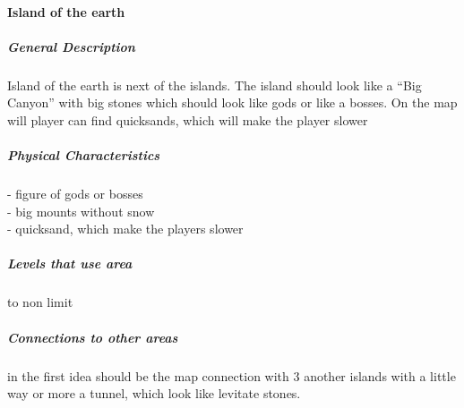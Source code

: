\documentclass[parskip=full]{scrartcl}
\begin{document}
					\paragraph{Island of the earth}\vspace{-0.5cm}
						\subparagraph{General Description} \vspace{-0.5cm}
							\par \begingroup
							\leftskip=2cm
							\noindent
									Island of the earth is next of the islands. The island should look like a “Big Canyon” with big stones which should look like gods or like a bosses.  On the map will player can find quicksands, which will make the player slower 
							\par \endgroup
						\subparagraph{Physical Characteristics} \vspace{-0.5cm}
							\par \begingroup
							\leftskip=2cm
							\noindent
									- figure of gods or bosses \\
									- big mounts without snow \\
									- quicksand, which make the players slower
							\par \endgroup
						\subparagraph{Levels that use area} \vspace{-0.5cm}
							\par \begingroup
							\leftskip=2cm
							 to non limit
							\par \endgroup
						\subparagraph{Connections to other areas} \vspace{-0.5cm}
							\par \begingroup
							\leftskip=2cm
							\noindent
									in the first idea should be the map connection with 3 another islands with a little way or more a tunnel, which look like levitate stones.
							\par \endgroup
\end{document}
